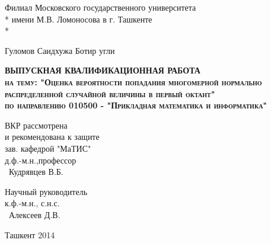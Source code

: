      \begin{titlepage}
    \newpage

    \begin{center}
    Филиал Московского государственного университета \\*
    имени М.В. Ломоносова в г. Ташкенте\\*
    \hrulefill
    \end{center}


    \vspace{8em}

    \begin{center}
    \Large Гуломов Саидхужа Ботир угли
    \end{center}

    \vspace{2.5em}

    \begin{center}
    \textsc{\textbf{ВЫПУСКНАЯ КВАЛИФИКАЦИОННАЯ РАБОТА \\ на тему: "Оценка вероятности попадания многомерной нормально распределенной случайной величины в первый октант" \\ по направлению 010500 - "Прикладная математика и информатика"}}
    \end{center}

    \vspace{15em}

    \begin{minipage}{0.5\hsize}
	\begin{flushleft}
	ВКР рассмотрена \\
	и рекомендована к защите\\
	зав. кафедрой "МаТИС"\\
	д.ф.-м.н.,профессор\\
	\hrulefill\ Кудрявцев В.Б.\qquad\qquad\qquad
	\end{flushleft}
    \end{minipage}
    \begin{minipage}{0.5\hsize}
	\begin{flushright}
    Научный руководитель \\
    к.ф.-м.н., с.н.с.\\
	\qquad\qquad\hrulefill\ Алексеев Д.В.
	\end{flushright}
	\end{minipage}


    \vspace{\fill}

    \begin{center}
    Ташкент 2014
    \end{center}

    \end{titlepage}